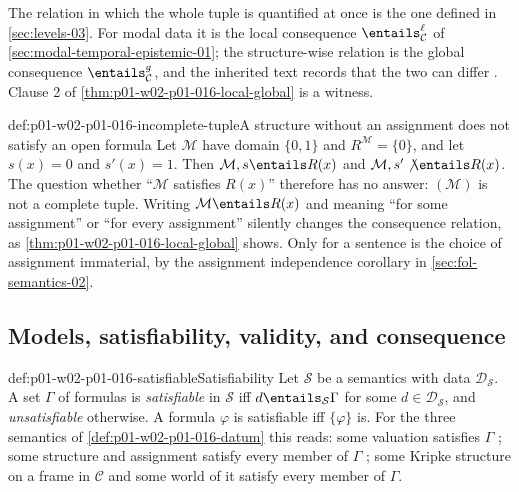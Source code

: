The relation in which the whole tuple is quantified at once is the one
defined in \cref{sec:levels-03}. For modal data it is the local consequence
\(\entails^{\ell}_{\mathcal C}\) of \cref{sec:modal-temporal-epistemic-01}; the
structure-wise relation is the global consequence
\(\entails^{g}_{\mathcal C}\), and the inherited text records that the two
can differ \cite[ch.~``Modal, Temporal, and Epistemic Logic'', definition
``Local and global modal consequence'']{FrozenFormalLogicSemanticData}.
Clause 2 of \cref{thm:p01-w02-p01-016-local-global} is a witness.

\begin{hbwarning}{def:p01-w02-p01-016-incomplete-tuple}{A structure without an assignment does not satisfy an open formula}
Let \(\mathcal M\) have domain \(\{0,1\}\) and \(R^{\mathcal M}=\{0\}\), and
let \(s(x)=0\) and \(s'(x)=1\). Then \(\mathcal M,s\entails R(x)\) and
\(\mathcal M,s'\not\entails R(x)\). The question whether ``\(\mathcal M\)
satisfies \(R(x)\)'' therefore has no answer: \((\mathcal M)\) is not a
complete tuple. Writing \(\mathcal M\entails R(x)\) and meaning ``for some
assignment'' or ``for every assignment'' silently changes the consequence
relation, as \cref{thm:p01-w02-p01-016-local-global} shows. Only for a
sentence is the choice of assignment immaterial, by the assignment
independence corollary in \cref{sec:fol-semantics-02}.
\end{hbwarning}

\subsection{Models, satisfiability, validity, and consequence}
\label{sec:p01-w02-p01-016-models}

\begin{hbdefinition}{def:p01-w02-p01-016-satisfiable}{Satisfiability}
Let \(\mathcal S\) be a semantics with data \(\mathcal D_{\mathcal S}\). A set
\(\Gamma\) of formulas is \emph{satisfiable} in \(\mathcal S\) iff
\(d\entails_{\mathcal S}\Gamma\) for some \(d\in\mathcal D_{\mathcal S}\),
and \emph{unsatisfiable} otherwise. A formula \(\varphi\) is satisfiable iff
\(\{\varphi\}\) is. For the three semantics of
\cref{def:p01-w02-p01-016-datum} this reads: some valuation satisfies
\(\Gamma\) \cite[ch.~``Propositional Syntax and Semantics'', definition
``Semantic notions'']{FrozenFormalLogicSemanticData}; some structure and
assignment satisfy every member of \(\Gamma\) \cite[ch.~``Theories and
Axiomatization'', definition ``Theory, model, satisfiability, and structure
theory'']{FrozenFormalLogicSemanticData}; some Kripke structure on a frame
in \(\mathcal C\) and some world of it satisfy every member of \(\Gamma\).
\end{hbdefinition}

